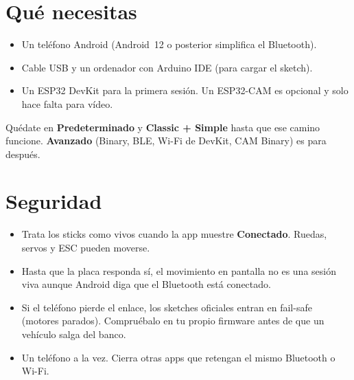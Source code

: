 \documentclass[12pt,a4paper]{article}
\newcommand{\ui}[1]{\textsf{\textbf{#1}}}
\begin{document}
\begin{center}
\end{center}

\section{Qué necesitas}
\label{sec:need}

\begin{itemize}[leftmargin=1.4cm]
  \item Un teléfono Android (Android~12 o posterior simplifica el Bluetooth).
  \item Cable USB y un ordenador con Arduino IDE (para cargar el sketch).
  \item Un ESP32 DevKit para la primera sesión.
        Un ESP32-CAM es opcional y solo hace falta para vídeo.
\end{itemize}

Quédate en \ui{Predeterminado} y \ui{Classic + Simple} hasta que ese camino
funcione. \ui{Avanzado} (Binary, BLE, Wi-Fi de DevKit, CAM Binary) es para
después.

\section{Seguridad}
\label{sec:safety}

\begin{itemize}[leftmargin=1.4cm]
  \item Trata los sticks como vivos cuando la app muestre \ui{Conectado}.
        Ruedas, servos y ESC pueden moverse.
  \item Hasta que la placa responda sí, el movimiento en pantalla no es una
        sesión viva aunque Android diga que el Bluetooth está conectado.
  \item Si el teléfono pierde el enlace, los sketches oficiales entran en
        fail-safe (motores parados). Compruébalo en tu propio firmware
        antes de que un vehículo salga del banco.
  \item Un teléfono a la vez. Cierra otras apps que retengan el mismo
        Bluetooth o Wi-Fi.
\end{itemize}
\end{document}
